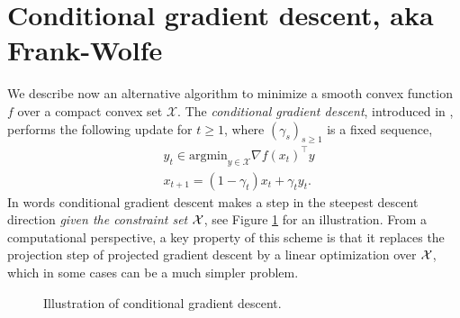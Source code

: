 \section{Conditional gradient descent, aka Frank-Wolfe} \label{sec:FW}
%
We describe now an alternative algorithm to minimize a smooth convex function $f$ over a compact convex set $\mathcal{X}$. The {\em conditional gradient descent}, introduced in \cite{FW56}, performs the following update for $t \geq 1$, where $(\gamma_s)_{s \geq 1}$ is a fixed sequence,
\begin{align}
&y_{t} \in \mathrm{argmin}_{y \in \mathcal{X}} \nabla f(x_t)^{\top} y \label{eq:FW1} \\
& x_{t+1} = (1 - \gamma_t) x_t + \gamma_t y_t . \label{eq:FW2}
\end{align}
In words conditional gradient descent makes a step in the steepest descent direction {\em given the constraint set $\mathcal{X}$}, see Figure \ref{fig:FW} for an illustration. From a computational perspective, a key property of this scheme is that it replaces the projection step of projected gradient descent by a linear optimization over $\mathcal{X}$, which in some cases can be a much simpler problem. 

\begin{figure}
\begin{center}
\end{center}
\caption{Illustration of conditional gradient descent.}
\label{fig:FW}
\end{figure}

